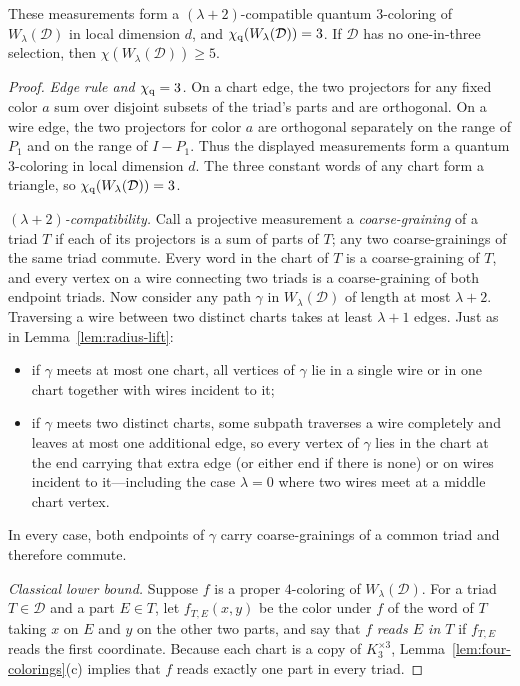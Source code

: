 \begin{proposition}\label{prop:one-in-three}
These measurements form a $(\lambda+2)$-compatible quantum $3$-coloring of $W_\lambda(\mathcal D)$ in local dimension $d$, and $\chi_{\mathrm q}(W_\lambda(\mathcal D))=3$. If $\mathcal D$ has no one-in-three selection, then $\chi(W_\lambda(\mathcal D))\ge5$.
\end{proposition}
\begin{proof}
\emph{Edge rule and $\chi_{\mathrm q}=3$.} On a chart edge, the two projectors for any fixed color $a$ sum over disjoint subsets of the triad's parts and are orthogonal. On a wire edge, the two projectors for color $a$ are orthogonal separately on the range of $P_1$ and on the range of $I-P_1$. Thus the displayed measurements form a quantum $3$-coloring in local dimension $d$. The three constant words of any chart form a triangle, so $\chi_{\mathrm q}(W_\lambda(\mathcal D))=3$.

\emph{$(\lambda+2)$-compatibility.} Call a projective measurement a \emph{coarse-graining} of a triad $T$ if each of its projectors is a sum of parts of $T$; any two coarse-grainings of the same triad commute. Every word in the chart of $T$ is a coarse-graining of $T$, and every vertex on a wire connecting two triads is a coarse-graining of both endpoint triads. Now consider any path $\gamma$ in $W_\lambda(\mathcal D)$ of length at most $\lambda+2$. Traversing a wire between two distinct charts takes at least $\lambda+1$ edges. Just as in Lemma~\ref{lem:radius-lift}:
\begin{itemize}
\item if $\gamma$ meets at most one chart, all vertices of $\gamma$ lie in a single wire or in one chart together with wires incident to it;
\item if $\gamma$ meets two distinct charts, some subpath traverses a wire completely and leaves at most one additional edge, so every vertex of $\gamma$ lies in the chart at the end carrying that extra edge (or either end if there is none) or on wires incident to it---including the case $\lambda=0$ where two wires meet at a middle chart vertex.
\end{itemize}
In every case, both endpoints of $\gamma$ carry coarse-grainings of a common triad and therefore commute.

\emph{Classical lower bound.} Suppose $f$ is a proper $4$-coloring of $W_\lambda(\mathcal D)$. For a triad $T\in\mathcal D$ and a part $E\in T$, let $f_{T,E}(x,y)$ be the color under $f$ of the word of $T$ taking $x$ on $E$ and $y$ on the other two parts, and say that $f$ \emph{reads $E$ in $T$} if $f_{T,E}$ reads the first coordinate. Because each chart is a copy of $K_3^{\times3}$, Lemma~\ref{lem:four-colorings}(c) implies that $f$ reads exactly one part in every triad.


\end{proof}
